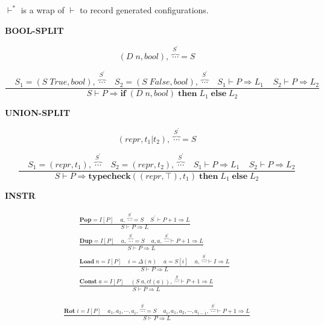 \documentclass[12pt, a4paper]{report}
\newcommand{\rulegroup}[1]{
    \textbf{#1}
}
\newcommand{\gap}{ \;\;\;\; }
\begin{document}
$\vdash^{*}$ is a wrap of $\vdash$ to record generated configurations.

\newpage

\rulegroup{BOOL-SPLIT}
\vspace*{\baselineskip}


$$
(D\; n, bool), \; \overbrace{\cdots}^{S^{'}}  = S
$$

\vspace*{-1.5\baselineskip}
$$
\dfrac{
    \gap
    S_1 = (S\;True, bool), \; \overbrace{\cdots}^{S^{'}}
    \gap
    S_2 = (S\;False, bool), \; \overbrace{\cdots}^{S^{'}}
    \gap
    S_1 \vdash P \Rightarrow L_1
    \gap
    S_2 \vdash P \Rightarrow L_2
}{
    S \vdash P \Rightarrow \mathbf{if} \; (D\; n, bool) \; \mathbf{then} \; L_1 \; \mathbf{else} \; L_2
}
$$


\rulegroup{UNION-SPLIT}

$$
(repr, t_1 | t_2), \; \overbrace{\cdots}^{S^{'}}  = S
$$

\vspace*{-1.5\baselineskip}
$$
\dfrac{
    \gap
    S_1 = (repr, t_1), \; \overbrace{\cdots}^{S^{'}}
    \gap
    S_2 = (repr, t_2), \; \overbrace{\cdots}^{S^{'}}
    \gap
    S_1 \vdash P \Rightarrow L_1
    \gap
    S_2 \vdash P \Rightarrow L_2
}{
    S \vdash P \Rightarrow  \mathbf{typecheck}((repr, \top), t_1) \; \mathbf{then} \; L_1 \; \mathbf{else} \; L_2
}
$$


\rulegroup{INSTR}

\begin{equation*}
\begin{split}
\frac{
    \mathbf{Pop} = I[P] \gap
    a , \; \overbrace{\cdots}^{S^{'}} = S \gap
    S^{'} \vdash P+1 \Rightarrow L
}{
    S \vdash P \Rightarrow L
}
\\
\frac{
    \mathbf{Dup} = I[P] \gap
    a , \; \overbrace{\cdots}^{S^{'}} = S \;\;\;\;
    a, a, \; \overbrace{\cdots}^{S^{'}}  \vdash P + 1 \Rightarrow L
}{
    S \vdash P \Rightarrow L
}
\\
\frac{\mathbf{Load}\; n = I[P] \gap i = \Delta(n) \gap a = S[i] \gap a, \; \overbrace{\cdots}^{S^{'}} \vdash I \Rightarrow L }
     {S \vdash P  \Rightarrow L }
\;\;
\\
\frac{ \mathbf{Const}\; a = I[P] \gap (S\;a, ct(a)), \; \overbrace{\cdots}^{S} \vdash P + 1 \Rightarrow L  }
       { S \vdash P \Rightarrow L }
\end{split}
\end{equation*}

\begin{equation*}
\begin{split}
\frac{
    \mathbf{Rot} \; i = I[P]
    \gap
    a_1, a_2, \cdots, a_i, \; \overbrace{\cdots}^{S^{'}} = S
    \gap
    a_i, a_1, a_2, \cdots, a_{i - 1},\; \overbrace{\cdots}^{S^{'}} \vdash P + 1 \Rightarrow L
}{
    S \vdash P \Rightarrow L
}
\end{split}
\end{equation*}
\end{document}
